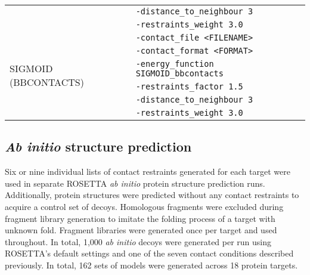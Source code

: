 \begin{table}[H]
\begin{tabularx}{\textwidth}{|X|X|}
                                & \texttt{-distance\_to\_neighbour 3} \\
                                & \texttt{-restraints\_weight 3.0} \\
        \hline
        \multirow{6}{1em}{SIGMOID (BBCONTACTS)} & \texttt{-contact\_file <FILENAME>} \\
                                & \texttt{-contact\_format <FORMAT>} \\
                                & \texttt{-energy\_function SIGMOID\_bbcontacts} \\
                                & \texttt{-restraints\_factor 1.5} \\
                                & \texttt{-distance\_to\_neighbour 3} \\
                                & \texttt{-restraints\_weight 3.0} \\
        \hline
    \end{tabularx}
\end{table}

\subsection{\textit{Ab initio} structure prediction}
Six or nine individual lists of contact restraints generated for each target were used in separate ROSETTA \textit{ab initio} protein structure prediction runs. Additionally, protein structures were predicted without any contact restraints to acquire a control set of decoys. Homologous fragments were excluded during fragment library generation to imitate the folding process of a target with unknown fold. Fragment libraries were generated once per target and used throughout. In total, 1,000 \textit{ab initio} decoys were generated per run using ROSETTA’s default settings \cite{Rohl2004-ou} and one of the seven contact conditions described previously. In total, 162 sets of models were generated across 18 protein targets.

